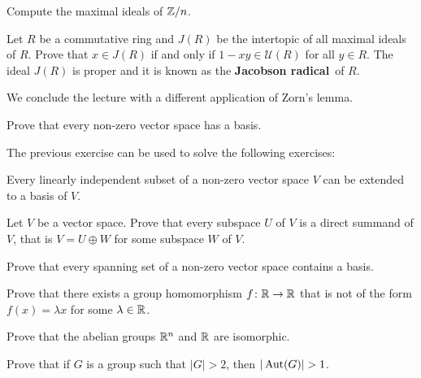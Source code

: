\begin{exercise}
	Compute the maximal ideals of $\mathbb{Z}/n$. 	
\end{exercise}

\begin{exercise}
	Let $R$ be a commutative ring and $J(R)$ be the intertopic of all maximal ideals 
	of $R$. Prove that $x\in J(R)$ 
	if and only if $1-xy\in\mathcal{U}(R)$ for all $y\in R$. The ideal $J(R)$ is proper
	and it is known
	as the \textbf{Jacobson radical} of $R$.  	
\end{exercise}

We conclude the lecture with a different application of Zorn's lemma.  

\begin{exercise}
	Prove that every non-zero vector space has a basis.
\end{exercise}

The previous exercise can be used to solve the following exercises:

\begin{exercise}
\label{xca:extend}
    Every linearly independent subset of a non-zero vector space
    $V$ can be extended to a basis of $V$.
\end{exercise} 

\begin{exercise}
    Let $V$ be a vector space. Prove that every subspace $U$ of $V$ is a direct summand of $V$, that is
    $V=U\oplus W$ for some subspace $W$ of $V$. 
\end{exercise}

\begin{exercise}
    Prove that every spanning set of a non-zero vector space
    contains a basis. 
\end{exercise}

\begin{exercise}
\label{xca:fx=cx}
    Prove that there exists a group homomorphism $f\colon\mathbb{R}\to\mathbb{R}$ that 
    is not of the form $f(x)=\lambda x$ for some $\lambda\in\mathbb{R}$. 
\end{exercise}


\begin{exercise}
\label{xca:Rn=R}
    Prove that the abelian groups $\mathbb{R}^n$ and $\mathbb{R}$ are isomorphic.
\end{exercise}

\begin{exercise}
\label{xca:aut}
    Prove that if $G$ is a group such that $|G|>2$, then $|\Aut(G)|>1$.
\end{exercise}

